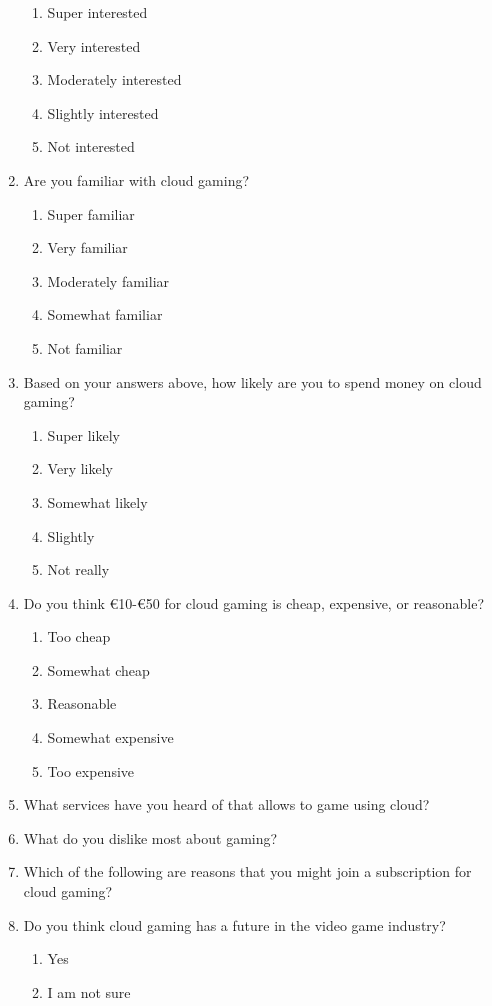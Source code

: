 \documentclass[]{report}
\begin{document}
\begin{enumerate}
\begin{enumerate}
			\item Super interested
			\item Very interested
			\item Moderately interested
			\item Slightly interested
			\item Not interested
		\end{enumerate}
		\item Are you familiar with cloud gaming?
		\begin{enumerate}
			\item Super familiar
			\item Very familiar
			\item Moderately familiar
			\item Somewhat familiar
			\item Not familiar
		\end{enumerate}
		\item Based on your answers above, how likely are you to spend money on cloud gaming?
		\begin{enumerate}
			\item Super likely
			\item Very likely
			\item Somewhat likely
			\item Slightly
			\item Not really
		\end{enumerate}
		\item Do you think €10-€50 for cloud gaming is cheap, expensive, or reasonable?
		\begin{enumerate}
			\item Too cheap
			\item Somewhat cheap
			\item Reasonable
			\item Somewhat expensive
			\item Too expensive
		\end{enumerate}
		\item What services have you heard of that allows to game using cloud?
		\item What do you dislike most about gaming?
		\item Which of the following are reasons that you might join a subscription for cloud gaming?
		\item Do you think cloud gaming has a future in the video game industry?
		\begin{enumerate}
			\item Yes
			\item I am not sure

\end{enumerate}
\end{enumerate}
\end{document}
